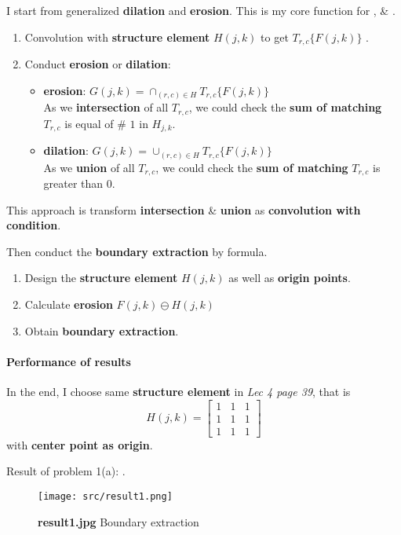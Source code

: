 I start from generalized \textbf{dilation} and \textbf{erosion}. This is my \alert{core function} for ,  \& .
\begin{enumerate}
    \item Convolution with \textbf{structure element} \(H(j, k)\) to get \(T_{r, c} \{F(j, k) \} \) .
    \item Conduct \textbf{erosion} or \textbf{dilation}:
	\begin{itemize}
	    \item \textbf{erosion}: \(G(j, k) = \cap_{(r, c) \in H} T_{r, c} \{F(j, k) \}  \) \\
		As we \textbf{intersection} of all \(T_{r, c}\), we could check the \textbf{sum of matching} \(T_{r, c}\) is \alert{equal} of \# \(1\) in \(H_{j, k}\).
	    \item \textbf{dilation}: \(G(j, k) = \cup_{(r, c) \in H} T_{r, c} \{F(j, k) \}  \) \\
		As we \textbf{union} of all \(T_{r, c}\), we could check the \textbf{sum of matching} \(T_{r, c}\) is \alert{greater than} \(0\).
	\end{itemize}
\end{enumerate}
This approach is transform \textbf{intersection} \& \textbf{union} as \textbf{convolution with condition}.

Then conduct the \textbf{boundary extraction} by formula. 
\begin{enumerate}
    \item Design the \textbf{structure element} \(H(j, k)\) as well as \textbf{origin points}.
    \item Calculate \textbf{erosion} \(F(j, k) \ominus H(j, k) \)
    \item Obtain \textbf{boundary extraction}.
\end{enumerate}

\paragraph{Performance of results}
In the end, I choose same \textbf{structure element} in \textit{Lec 4 page 39}, that is
\[
    H(j, k) = \begin{bmatrix}
	1 & 1 & 1\\
	1 & 1 & 1\\
	1 & 1 & 1
    \end{bmatrix}
\]
with \textbf{center point as origin}.

Result of problem 1(a): .
\begin{figure}
    \centering
    \texttt{[image: src/result1.png]}
    \caption{\textbf{result1.jpg} Boundary extraction}
    \label{result1}
\end{figure}

